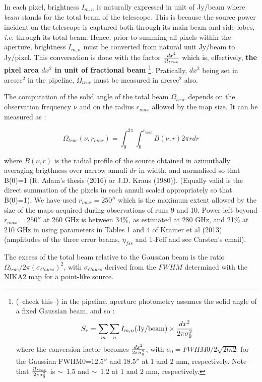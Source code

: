 In each pixel, brightness $I_{m,n}$ is naturally expressed in unit of
Jy/beam where  {\it beam } stands for the total beam of the telescope. This is because the
source power incident on the telescope is captured both through its main
beam and side lobes, {\it i.e.} through its total beam.
Hence, prior to summing all pixels within the aperture, brightness $I_{m,n}$ 
must be converted from natural unit Jy/beam to Jy/pixel. This
conversation is done with the factor $dx^2 \over {\Omega_{true}}$ 
which  is, effectively, {\bf the pixel area $dx^2$  in unit of fractional beam}
\footnote{(--check this--) in the pipeline, aperture photometry assumes the solid angle of a fixed Gaussian beam, and so :
  $$S_{\nu} = \sum_{m} \sum_{n}  I_{m,n} ({\rm Jy/beam}) \times {dx^2 \over {2 \pi \sigma_0^2}}$$
  where the conversion factor becomes ${dx^2 \over {2 \pi \sigma_0^2}}$, with
  $\sigma_0=FWHM0/2\sqrt{2 ln2}$ for the Gaussian FWHM0=$12.5''$
and $18.5''$ at 1 and 2 mm, respectively.  Note that ${\Omega_{true}} \over {2 \pi \sigma_0^2 }$  is $\sim$~1.5 and $\sim$~1.2 at 1 and 2 mm, respectively.}.
Pratically, $dx^2$ being set in arcsec$^2$ in the pipeline,
$\Omega_{true}$ must  be measured in arcsec$^2$ also.

The computation of the solid angle of the total beam $\Omega_{true}$ depends on the
observation frequency $\nu$ and on the radius $r_{max }$ allowed by the
map size. It can be measured as :

\begin{equation}
 \Omega_{true} (\nu,r_{max}) = \int_0^{2\pi} \int_0^{r_{max}} B(\nu, r) 2 \pi r dr
\label{eq:Otrue}
\end{equation}

\noindent where $B(\nu,r)$ is the radial profile of the source obtained in azimuthally averaging brigthness over narrow annuli
$dr$ in width, and normalised so that B(0)=1 (R. Adam's thesis (2016) or J.D. Kraus (1980)).
(Equally valid is the  direct summation of the pixels in each annuli scaled  appropriately so that B(0)=1). 
We have used $r_{max}=250''$ which is the maximum extent allowed by
the size of the maps acquired during observations of runs 9 and 10.
Power left beyond $r_{max}=250''$ at 260 GHz is between 34\%, as
estimated at 280 GHz, and 21\% at
210 GHz in using parameters in Tables 1 and 4 of Kramer et al
(2013) (amplitudes of the three error beams, $\eta_{fss}$ and 1-Feff and see Carsten's email).

The excess of the total beam relative to the Gaussian beam is the ratio
$\Omega_{true} / 2 \pi (\sigma_{Gauss})^2$, with  $\sigma_{Gauss}$ derived from the $FWHM$ determined
with  the NIKA2 map for a point-like source.


